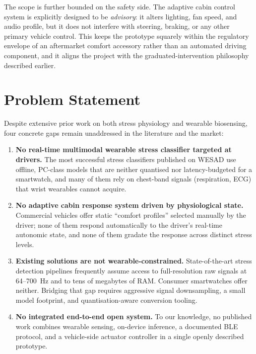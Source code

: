 The scope is further bounded on the safety side. The adaptive cabin
control system is explicitly designed to be \emph{advisory}: it alters
lighting, fan speed, and audio profile, but it does not interfere with
steering, braking, or any other primary vehicle control. This keeps
the prototype squarely within the regulatory envelope of an aftermarket
comfort accessory rather than an automated driving component, and it
aligns the project with the graduated-intervention philosophy described
earlier.

\section{Problem Statement}
\label{sec:problem}

Despite extensive prior work on both stress physiology and wearable
biosensing, four concrete gaps remain unaddressed in the literature
and the market:

\begin{enumerate}
  \item \textbf{No real-time multimodal wearable stress classifier
  targeted at drivers.} The most successful stress classifiers
  published on WESAD use offline, PC-class models that are neither
  quantised nor latency-budgeted for a smartwatch, and many of them
  rely on chest-band signals (respiration, ECG) that wrist wearables
  cannot acquire.

  \item \textbf{No adaptive cabin response system driven by
  physiological state.} Commercial vehicles offer static ``comfort
  profiles'' selected manually by the driver; none of them respond
  automatically to the driver's real-time autonomic state, and none
  of them gradate the response across distinct stress levels.

  \item \textbf{Existing solutions are not wearable-constrained.}
  State-of-the-art stress detection pipelines frequently assume access
  to full-resolution raw signals at 64--700~Hz and to tens of megabytes
  of RAM. Consumer smartwatches offer neither. Bridging that gap
  requires aggressive signal downsampling, a small model footprint,
  and quantisation-aware conversion tooling.

  \item \textbf{No integrated end-to-end open system.} To our
  knowledge, no published work combines wearable sensing, on-device
  inference, a documented BLE protocol, and a vehicle-side actuator
  controller in a single openly described prototype.
\end{enumerate}

